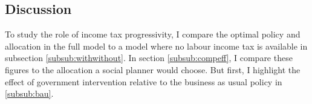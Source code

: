 \begin{figure}[h!!]
\begin{minipage}[]{0.32\textwidth}
\end{minipage}
\end{figure} 



\subsection{Discussion}\label{subsec:dis}
To study the role of income tax progressivity, I compare the optimal policy and allocation in the full model to a  model where no labour income tax is available in subsection \ref{subsub:withwithout}. In section \ref{subsub:compeff}, I compare these figures to the allocation a social planner would choose.
But first, I highlight the effect of government intervention relative to the business as usual policy in \ref{subsub:bau}. 

